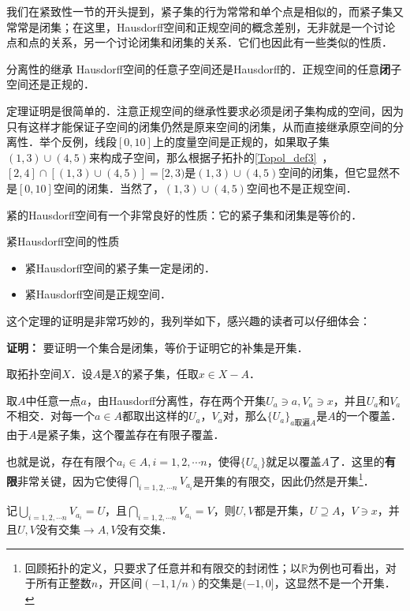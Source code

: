 我们在紧致性一节的开头提到，紧子集的行为常常和单个点是相似的，而紧子集又常常是闭集；在这里，Hausdorff空间和正规空间的概念差别，无非就是一个讨论点和点的关系，另一个讨论闭集和闭集的关系．它们也因此有一些类似的性质．

\begin{theorem}{分离性的继承}
Hausdorff空间的任意子空间还是Hausdorff的．正规空间的任意\textbf{闭}子空间还是正规的．
\end{theorem}

定理证明是很简单的．注意正规空间的继承性要求必须是闭子集构成的空间，因为只有这样才能保证子空间的闭集仍然是原来空间的闭集，从而直接继承原空间的分离性．举个反例，线段$[0,10]$上的度量空间是正规的，如果取子集$(1,3)\cup(4,5)$来构成子空间，那么根据子拓扑的\autoref{Topol_def3}~，$[2,4]\cap[(1,3)\cup(4,5)]=[2,3)$是$(1,3)\cup(4,5)$空间的闭集，但它显然不是$[0,10]$空间的闭集．当然了，$(1,3)\cup(4,5)$空间也不是正规空间．

紧的Hausdorff空间有一个非常良好的性质：它的紧子集和闭集是等价的．
\begin{theorem}{紧Hausdorff空间的性质}
\begin{itemize}
\item 紧Hausdorff空间的紧子集一定是闭的．
\item 紧Hausdorff空间是正规空间．

\end{itemize}
\end{theorem}

这个定理的证明是非常巧妙的，我列举如下，感兴趣的读者可以仔细体会：

\textbf{证明：}
要证明一个集合是闭集，等价于证明它的补集是开集．

取拓扑空间$X$．设$A$是$X$的紧子集，任取$x\in X-A$．

取$A$中任意一点$a$，由Hausdorff分离性，存在两个开集$U_a\ni a, V_a\ni x$，并且$U_a$和$V_a$不相交．对每一个$a\in A$都取出这样的$U_a$，$V_a$对，那么$\{U_a\}_{a\text{取遍}A}$是$A$的一个覆盖．由于$A$是紧子集，这个覆盖存在有限子覆盖．

也就是说，存在有限个$a_i\in A, i=1, 2, \cdots n$，使得$\{U_{a_i}\}$就足以覆盖$A$了．这里的\textbf{有限}非常关键，因为它使得$\bigcap\limits_{i=1,2, \cdots n}V_{a_i}$是开集的有限交，因此仍然是开集\footnote{回顾拓扑的定义，只要求了任意并和有限交的封闭性；以$\mathbb{R}$为例也可看出，对于所有正整数$n$，开区间$(-1,1/n)$的交集是$(-1, 0]$，这显然不是一个开集．}．

记$\bigcup\limits_{i=1,2, \cdots n}V_{a_i}=U$，且$\bigcap\limits_{i=1,2, \cdots n}V_{a_i}=V$，则$U, V$都是开集，$U\supseteq A$，$V\ni x$，并且$U, V$没有交集$\rightarrow A, V$没有交集．


